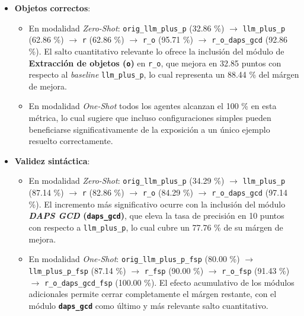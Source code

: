 \begin{itemize}
\item \textbf{Objetos correctos}:
	\begin{itemize}
	\item En modalidad \textit{Zero-Shot}: \texttt{orig\_llm\_plus\_p} (\textcolor[rgb]{0.0,0.33,0.0}{32.86 \%}) $\rightarrow$ \texttt{llm\_plus\_p} (\textcolor[rgb]{0.0,0.63,0.0}{62.86 \%}) $\rightarrow$ \texttt{r} (\textcolor[rgb]{0.0,0.63,0.0}{62.86 \%}) $\rightarrow$ \texttt{r\_o} (\textcolor[rgb]{0.0,0.96,0.0}{95.71 \%}) $\rightarrow$ \texttt{r\_o\_daps\_gcd} (\textcolor[rgb]{0.0,0.93,0.0}{92.86 \%}). El salto cuantitativo relevante lo ofrece la inclusión del módulo de \textbf{Extracción de objetos (\texttt{o})} en \texttt{r\_o}, que mejora en \textcolor[rgb]{0.0,0.88,0.0}{32.85} puntos con respecto al \textit{baseline} \texttt{llm\_plus\_p}, lo cual representa un \textcolor[rgb]{0.0,0.88,0.0}{88.44 \%} del márgen de mejora.
	\item En modalidad \textit{One-Shot} todos los agentes alcanzan el \textcolor[rgb]{0.0,1.0,0.0}{100 \%} en esta métrica, lo cual sugiere que incluso configuraciones simples pueden beneficiarse significativamente de la exposición a un único ejemplo resuelto correctamente.
	\end{itemize}
\item \textbf{Validez sintáctica}:
	\begin{itemize}
	\item En modalidad \textit{Zero-Shot}: \texttt{orig\_llm\_plus\_p} (\textcolor[rgb]{0.0,0.34,0.0}{34.29 \%}) $\rightarrow$ \texttt{llm\_plus\_p} (\textcolor[rgb]{0.0,0.87,0.0}{87.14 \%}) $\rightarrow$ \texttt{r} (\textcolor[rgb]{0.0,0.83,0.0}{82.86 \%}) $\rightarrow$ \texttt{r\_o} (\textcolor[rgb]{0.0,0.84,0.0}{84.29 \%}) $\rightarrow$ \texttt{r\_o\_daps\_gcd} (\textcolor[rgb]{0.0,0.97,0.0}{97.14 \%}). El incremento más significativo ocurre con la inclusión del módulo \textbf{\textit{DAPS GCD} (\texttt{daps\_gcd})}, que eleva la tasa de precisión en \textcolor[rgb]{0.0,0.77,0.0}{10} puntos con respecto a \texttt{llm\_plus\_p}, lo cual cubre un \textcolor[rgb]{0.0,0.77,0.0}{77.76 \%} de su márgen de mejora.
	\item En modalidad \textit{One-Shot}: \texttt{orig\_llm\_plus\_p\_fsp} (\textcolor[rgb]{0.0,0.80,0.0}{80.00 \%}) $\rightarrow$ \texttt{llm\_plus\_p\_fsp} (\textcolor[rgb]{0.0,0.87,0.0}{87.14 \%}) $\rightarrow$ \texttt{r\_fsp} (\textcolor[rgb]{0.0,0.90,0.0}{90.00 \%}) $\rightarrow$ \texttt{r\_o\_fsp} (\textcolor[rgb]{0.0,0.91,0.0}{91.43 \%}) $\rightarrow$ \texttt{r\_o\_daps\_gcd\_fsp} (\textcolor[rgb]{0.0,1.00,0.0}{100.00 \%}). El efecto acumulativo de los módulos adicionales permite cerrar completamente el márgen restante, con el módulo \textbf{\texttt{daps\_gcd}} como último y más relevante salto cuantitativo.

\end{itemize}
\end{itemize}
